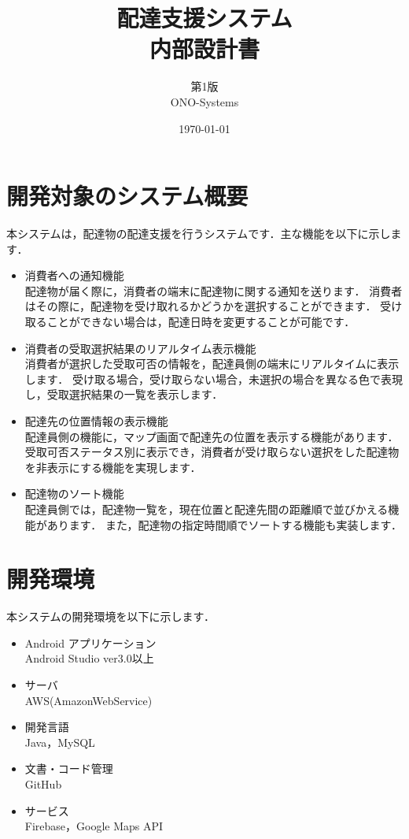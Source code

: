\documentclass[a4j,titlepage]{jarticle}
\title{\huge 配達支援システム\\
		内部設計書}
\author{第1版\\
        ONO-Systems\\}
\date{\today}
\begin{document}
\maketitle

\tableofcontents
\clearpage


\section{開発対象のシステム概要}
本システムは，配達物の配達支援を行うシステムです．主な機能を以下に示します．
\begin{itemize}
\item 消費者への通知機能\\
  配達物が届く際に，消費者の端末に配達物に関する通知を送ります．
  消費者はその際に，配達物を受け取れるかどうかを選択することができます．
  受け取ることができない場合は，配達日時を変更することが可能です．
\item 消費者の受取選択結果のリアルタイム表示機能\\
  消費者が選択した受取可否の情報を，配達員側の端末にリアルタイムに表示します．
  受け取る場合，受け取らない場合，未選択の場合を異なる色で表現し，受取選択結果の一覧を表示します．
\item 配達先の位置情報の表示機能\\
  配達員側の機能に，マップ画面で配達先の位置を表示する機能があります．
  受取可否ステータス別に表示でき，消費者が受け取らない選択をした配達物を非表示にする機能を実現します．
\item 配達物のソート機能\\
  配達員側では，配達物一覧を，現在位置と配達先間の距離順で並びかえる機能があります．
  また，配達物の指定時間順でソートする機能も実装します．
\end{itemize}


\section{開発環境}
本システムの開発環境を以下に示します．
\begin{itemize}
\item Android アプリケーション\\
  Android Studio ver3.0以上
\item サーバ\\
  AWS(AmazonWebService)
\item 開発言語\\
  Java，MySQL
\item 文書・コード管理\\
  GitHub
\item サービス\\
  Firebase，Google Maps API
\end{itemize}
\end{document}
